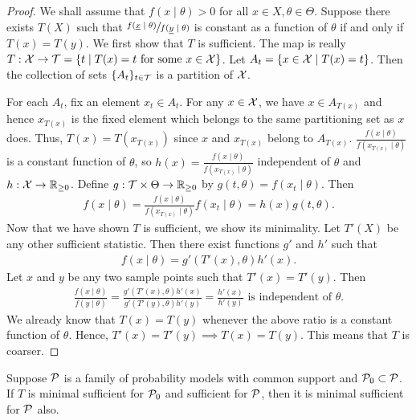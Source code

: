 \begin{proof}
    We shall assume that $f(x \mid \theta) > 0$ for all $x \in X, \theta \in \Theta$. Suppose there exists $T(X)$ such that $\sfrac{f(\underline{x}\mid\theta)}{f(\underline{y}\mid\theta)}$ is constant as a function of $\theta$ if and only if $T(x) = T(y)$. We first show that $T$ is sufficient. The map is really $T:\mathcal{X} \to \mathcal{T} = \{t \mid T(x) = t \text{ for some } x \in \mathcal{X}\}$. Let $A_{t} = \{x \in \mathcal{X} \mid T(x) = t\}$. Then the collection of sets $\{A_{t}\}_{t \in \mathcal{T}}$ is a partition of $\mathcal{X}$.

    For each $A_{t}$, fix an element $x_{t} \in A_{t}$. For any $x \in \mathcal{X}$, we have $x \in A_{T(x)}$ and hence $x_{T(x)}$ is the fixed element which belongs to the same partitioning set as $x$ does. Thus, $T(x) = T(x_{T(x)})$ since $x$ and $x_{T(x)}$ belong to $A_{T(x)}$. $\frac{f(x\mid\theta)}{f(x_{T(x)}\mid\theta)}$ is a constant function of $\theta$, so $h(x) = \frac{f(x\mid\theta)}{f(x_{T(x)}\mid\theta)}$ independent of $\theta$ and $h:\mathcal{X} \to \mathbb{R}_{\geq 0}$. Define $g:\mathcal{T} \times \Theta \to \mathbb{R}_{\geq 0}$ by $g(t,\theta) = f(x_{t} \mid \theta)$. Then
    \begin{align}
        f(x \mid \theta) = \frac{f(x\mid\theta)}{f(x_{T(x)}\mid\theta)} f(x_{t} \mid \theta) = h(x) g(t,\theta).
    \end{align}
    Now that we have shown $T$ is sufficient, we show its minimality. Let $T'(X)$ be any other sufficient statistic. Then there exist functions $g'$ and $h'$ such that
    \begin{align}
        f(x\mid\theta) = g'(T'(x),\theta)h'(x).
    \end{align}
    Let $x$ and $y$ be any two sample points such that $T'(x) = T'(y)$. Then
    \begin{align}
        \frac{f(x\mid\theta)}{f(y\mid\theta)} = \frac{g'(T'(x),\theta)h'(x)}{g'(T'(y),\theta)h'(y)} = \frac{h'(x)}{h'(y)} \text{ is independent of } \theta.
    \end{align}
    We already know that $T(x) = T(y)$ whenever the above ratio is a constant function of $\theta$. Hence, $T'(x) = T'(y) \implies T(x) = T(y)$. This means that $T$ is coarser.
\end{proof}

\begin{theorem}
    Suppose $\mathcal{P}$ is a family of probability models with common support and $\mathcal{P}_{0} \subset \mathcal{P}$. If $T$ is minimal sufficient for $\mathcal{P}_{0}$ and sufficient for $\mathcal{P}$, then it is minimal sufficient for $\mathcal{P}$ also.
\end{theorem}

